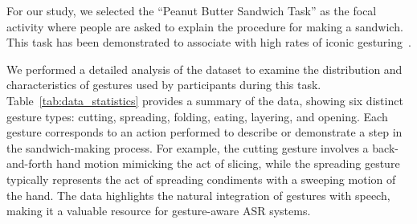 \begin{table}[t]
\centering
\caption{Summary of data statistics of `Peanut Butter Task' based on gesture annotation.}
\label{tab:data_statistics}
\end{table}



For our study, we selected the ``Peanut Butter Sandwich Task'' as the focal activity where people are asked to explain the procedure for making a sandwich. This task has been demonstrated to associate with high rates of iconic gesturing~\cite{stark2022task,stark2023demographic,pritchard2015language,illes1989neurolinguistic}.

We performed a detailed analysis of the dataset to examine the distribution and characteristics of gestures used by participants during this task. Table~\ref{tab:data_statistics} provides a summary of the data, showing six distinct gesture types: cutting, spreading, folding, eating, layering, and opening. Each gesture corresponds to an action performed to describe or demonstrate a step in the sandwich-making process. For example, the cutting gesture involves a back-and-forth hand motion mimicking the act of slicing, while the spreading gesture typically represents the act of spreading condiments with a sweeping motion of the hand. The data highlights the natural integration of gestures with speech, making it a valuable resource for gesture-aware ASR systems.

